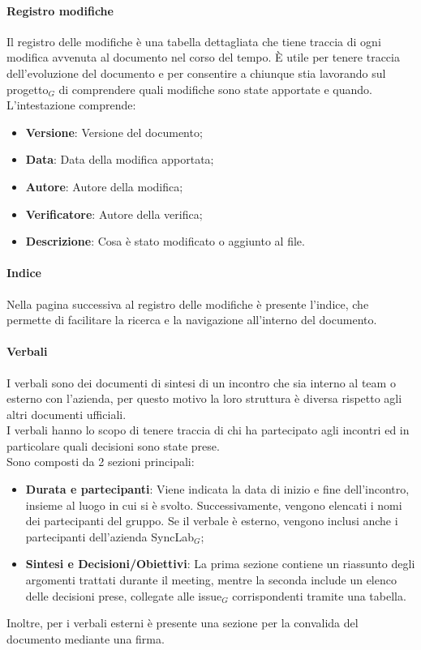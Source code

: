 \documentclass[10pt]{article}
\begin{document}
\begin{justify}
        \paragraph{Registro modifiche}
        Il registro delle modifiche è una tabella dettagliata che tiene traccia di ogni modifica avvenuta al documento nel corso del tempo. È utile per tenere traccia dell'evoluzione del documento e per consentire a chiunque stia lavorando sul progetto$_G$ di comprendere quali modifiche sono state apportate e quando.
        L'intestazione comprende:
        \begin{itemize}
            \item \textbf{Versione}: Versione del documento;
            \item \textbf{Data}: Data della modifica apportata;
            \item \textbf{Autore}: Autore della modifica;
            \item \textbf{Verificatore}: Autore della verifica;
            \item \textbf{Descrizione}: Cosa è stato modificato o aggiunto al file.
        \end{itemize}

        \paragraph{Indice}
        Nella pagina successiva al registro delle modifiche è presente l'indice, che permette di facilitare la ricerca e la navigazione all'interno del documento.\\

        \paragraph{Verbali}
        I verbali sono dei documenti di sintesi di un incontro che sia interno al team o esterno con l'azienda, per questo motivo la loro struttura è diversa rispetto agli altri documenti ufficiali.\\
        I verbali hanno lo scopo di tenere traccia di chi ha partecipato agli incontri ed in particolare quali decisioni sono state prese.\\
        Sono composti da 2 sezioni principali:
        \begin{itemize}
            \item \textbf{Durata e partecipanti}: Viene indicata la data di inizio e fine dell'incontro, insieme al luogo in cui si è svolto. Successivamente, vengono elencati i nomi dei partecipanti del gruppo. Se il verbale è esterno, vengono inclusi anche i partecipanti dell'azienda SyncLab$_G$;
            \item \textbf{Sintesi e Decisioni/Obiettivi}: La prima sezione contiene un riassunto degli argomenti trattati durante il meeting, mentre la seconda include un elenco delle decisioni prese, collegate alle issue$_G$ corrispondenti tramite una tabella.
        \end{itemize}
        Inoltre, per i verbali esterni è presente una sezione per la convalida del documento mediante una firma.\\


\end{justify}
\end{document}

